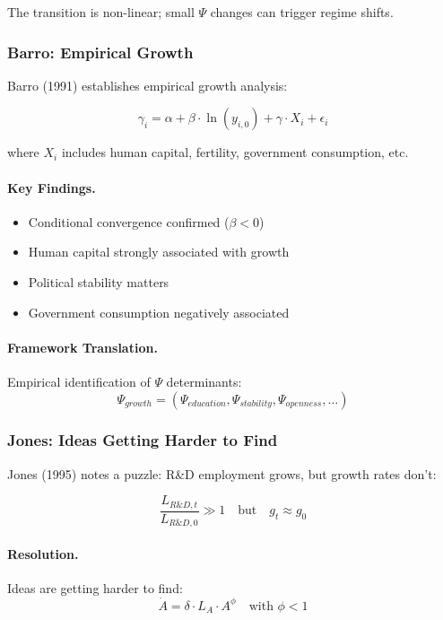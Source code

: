 The transition is non-linear; small $\Psi$ changes can trigger regime shifts.

\subsubsection{Barro: Empirical Growth}

Barro (1991) establishes empirical growth analysis:

\begin{equation}
\gamma_i = \alpha + \beta \cdot \ln(y_{i,0}) + \gamma \cdot X_i + \epsilon_i
\end{equation}

where $X_i$ includes human capital, fertility, government consumption, etc.

\paragraph{Key Findings.}
\begin{itemize}
    \item Conditional convergence confirmed ($\beta < 0$)
    \item Human capital strongly associated with growth
    \item Political stability matters
    \item Government consumption negatively associated
\end{itemize}

\paragraph{Framework Translation.}
Empirical identification of $\Psi$ determinants:
\begin{equation}
\Psi_{growth} = (\Psi_{education}, \Psi_{stability}, \Psi_{openness}, \ldots)
\end{equation}

\subsubsection{Jones: Ideas Getting Harder to Find}

Jones (1995) notes a puzzle: R\&D employment grows, but growth rates don't:

\begin{equation}
\frac{L_{R\&D,t}}{L_{R\&D,0}} \gg 1 \quad \text{but} \quad g_t \approx g_0
\end{equation}

\paragraph{Resolution.}
Ideas are getting harder to find:
\begin{equation}
\dot{A} = \delta \cdot L_A \cdot A^\phi \quad \text{with } \phi < 1
\end{equation}

